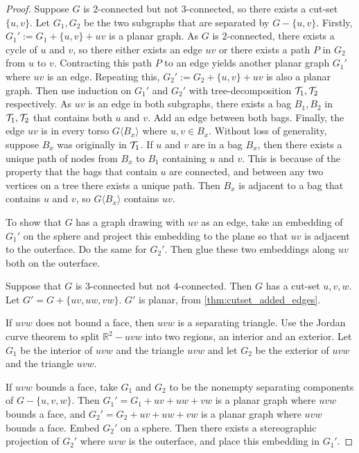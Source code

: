 \begin{proof}
	Suppose $G$ is $2$-connected but not $3$-connected, so there exists a cut-set $\{u,v\}$. Let $G_1, G_2$ be the two subgraphs that are separated by $G - \{u, v\}$. Firstly, $G_1' := G_1 + \{u,v\} + uv$ is a planar graph. As $G$ is $2$-connected, there exists a cycle of $u$ and $v$, so there either exists an edge $uv$ or there exists a path $P$ in $G_2$ from $u$ to $v$. Contracting this path $P$ to an edge yields another planar graph $G_1'$ where $uv$ is an edge. Repeating this, $G_2' := G_2 + \{u,v\} + uv$ is also a planar graph. Then use induction on $G_1'$ and $G_2'$ with tree-decomposition $\mathcal{T}_1, \mathcal{T}_2$ respectively. As $uv$ is an edge in both subgraphs, there exists a bag $B_1, B_2$ in $\mathcal{T}_1, \mathcal{T}_2$ that contains both $u$ and $v$. Add an edge between both bags. Finally, the edge $uv$ is in every torso $G\langle B_x \rangle$ where $u, v \in B_x$. Without loss of generality, suppose $B_x$ was originally in $\mathcal{T}_1$. If $u$ and $v$ are in a bag $B_x$, then there exists a unique path of nodes from $B_x$ to $B_1$ containing $u$ and $v$. This is because of the property that the bags that contain $u$ are connected, and between any two vertices on a tree there exists a unique path. Then $B_x$ is adjacent to a bag that contains $u$ and $v$, so $G \langle B_x \rangle$ contains $uv$. 

	To show that $G$ has a graph drawing with $uv$ as an edge, take an embedding of $G_1'$ on the sphere and project this embedding to the plane so that $uv$ is adjacent to the outerface. Do the same for $G_2'$. Then glue these two embeddings along $uv$ both on the outerface. 

	Suppose that $G$ is $3$-connected but not $4$-connected. Then $G$ has a cut-set $u,v,w$. Let $G' = G + \{uv, uw, vw\}$. $G'$ is planar, from \cref{thm:cutset_added_edges}. 
	
	If $uvw$ does not bound a face, then $uvw$ is a separating triangle. Use the Jordan curve theorem to split $\mathbb{R}^2 - uvw$ into two regions, an interior and an exterior. Let $G_1$ be the interior of $uvw$ and the triangle $uvw$ and let $G_2$ be the exterior of $uvw$ and the triangle $uvw$. 

	If $uvw$ bounds a face, take $G_1$ and $G_2$ to be the nonempty separating components of $G - \{u,v,w\}$. Then $G_1' = G_1 + uv + uw + vw$ is a planar graph where $uvw$ bounds a face, and $G_2' = G_2 + uv + uw + vw$ is a planar graph where $uvw$ bounds a face. Embed $G_2'$ on a sphere. Then there exists a stereographic projection of $G_2'$ where $uvw$ is the outerface, and place this embedding in $G_1'$. 


\end{proof}

